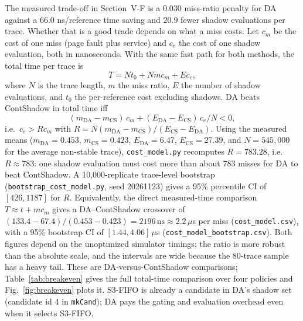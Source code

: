 \documentclass[10pt,twocolumn,a4paper]{IEEEtran}
\begin{document}
The measured trade-off in Section~V-F is a 0.030 miss-ratio penalty for DA
against a 66.0 ns/reference time saving and 20.9 fewer shadow evaluations per
trace. Whether that is a good trade depends on what a miss costs. Let $c_m$ be
the cost of one miss (page fault plus service) and $c_e$ the cost of one shadow
evaluation, both in nanoseconds. With the same fast path for both methods, the
total time per trace is
\begin{equation}
T = N t_0 + N m c_m + E c_e,
\label{eq:cost}
\end{equation}
where $N$ is the trace length, $m$ the miss ratio, $E$ the number of shadow
evaluations, and $t_0$ the per-reference cost excluding shadows. DA beats
ContShadow in total time iff
\begin{equation}
(m_{\mathrm{DA}} - m_{\mathrm{CS}})\,c_m
+ (E_{\mathrm{DA}} - E_{\mathrm{CS}})\,c_e/N < 0,
\label{eq:breakeven}
\end{equation}
i.e.\ $c_e > R c_m$ with
$R = N(m_{\mathrm{DA}} - m_{\mathrm{CS}})/(E_{\mathrm{CS}} - E_{\mathrm{DA}})$.
Using the measured means ($m_{\mathrm{DA}}=0.453$, $m_{\mathrm{CS}}=0.423$,
$E_{\mathrm{DA}}=6.47$, $E_{\mathrm{CS}}=27.39$, and $N=545{,}000$ for the
average non-stable trace), \texttt{cost\_model.py} recomputes $R = 783.28$,
i.e.\ $R \approx 783$: one shadow evaluation must cost more than about 783
misses for DA to beat ContShadow. A 10,000-replicate trace-level bootstrap
(\texttt{bootstrap\_cost\_model.py}, seed 20261123) gives a 95\% percentile CI
of $[426, 1187]$ for $R$. Equivalently, the direct measured-time comparison
$T \approx t + m c_m$ gives a DA--ContShadow crossover of
$(133.4-67.4)/(0.453-0.423) = 2196\,\mathrm{ns} \approx 2.2\,\mu$s per miss
(\texttt{cost\_model.csv}), with a 95\% bootstrap CI of
$[1.44, 4.06]\,\mu$s (\texttt{cost\_model\_bootstrap.csv}). Both figures depend
on the unoptimized simulator timings; the ratio is more robust than the
absolute scale, and the intervals are wide because the 80-trace sample has a
heavy tail. These are DA-versus-ContShadow comparisons; Table~\ref{tab:breakeven}
gives the full total-time comparison over four policies and
Fig.~\ref{fig:breakeven} plots it. S3-FIFO is already a candidate in DA's shadow
set (candidate id 4 in \texttt{mkCand}); DA pays the gating and evaluation
overhead even when it selects S3-FIFO.
\end{document}
